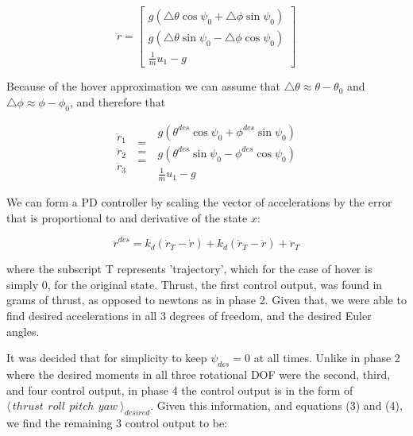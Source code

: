 \begin{equation}
\ddot r =
\begin{bmatrix}
g(\bigtriangleup \theta \cos \psi_0 + \bigtriangleup \phi \sin \psi_0 ) \\ 
g(\bigtriangleup \theta \sin \psi_0 - \bigtriangleup \phi \cos \psi_0 ) \\ 
\frac{1}{m}u_1 - g
\end{bmatrix}
\end{equation}

Because of the hover approximation we can assume that $\bigtriangleup \theta \approx \theta - \theta_0$ and $ \bigtriangleup \phi \approx \phi - \phi_0 $, and therefore that

\begin{equation}
\begin{matrix}
\ddot r_1 \\ \ddot r_2  \\ \ddot r_3 
\end{matrix}
\begin{matrix}
~=~ \\ ~=~  \\ ~=~ 
\end{matrix}
\begin{matrix}
g(\theta^{des} \cos \psi_0 + \phi^{des} \sin \psi_0 ) \\ 
g(\theta^{des} \sin \psi_0 - \phi^{des} \cos \psi_0 ) \\ 
\frac{1}{m}u_1 - g
\end{matrix}
\end{equation}

We can form a PD controller by scaling the vector of accelerations by the error that is proportional to and derivative of the state $x$:


\begin{equation}
\ddot r^{des} = k_d(\dot r_T - \dot r) + k_d(\dot r_T - \dot r) + \ddot r_T
\end{equation}

where the subscript T represents 'trajectory', which for the case of hover is simply 0, for the original state. Thrust, the first control output, was found in grams of thrust, as opposed to newtons as in phase 2. Given that, we were able to find desired accelerations in all 3 degrees of freedom, and the desired Euler angles.

It was decided that for simplicity to keep $\psi_{des}=0$ at all times. Unlike in phase 2 where the desired moments in all three rotational DOF were the second, third, and four control output, in phase 4 the control output is in the form of
$ \langle \, thrust~ \, roll~ \, pitch~ \, yaw~ \rangle_{desired}$.
Given this information, and equations (3) and (4), we find the remaining 3 control output to be: 

